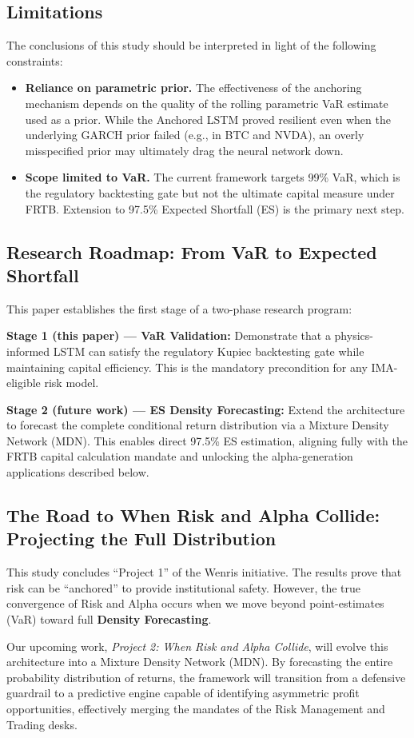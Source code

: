 \subsection*{Limitations}

The conclusions of this study should be interpreted in light of the following constraints:

\begin{itemize}
    \item \textbf{Reliance on parametric prior.} The effectiveness of the anchoring mechanism depends on the quality of the rolling parametric VaR estimate used as a prior. While the Anchored LSTM proved resilient even when the underlying GARCH prior failed (e.g., in BTC and NVDA), an overly misspecified prior may ultimately drag the neural network down.
    \item \textbf{Scope limited to VaR.} The current framework targets 99\% VaR, which is the regulatory backtesting gate but not the ultimate capital measure under FRTB. Extension to 97.5\% Expected Shortfall (ES) is the primary next step.
\end{itemize}

\subsection*{Research Roadmap: From VaR to Expected Shortfall}

This paper establishes the first stage of a two-phase research program:

\textbf{Stage 1 (this paper) --- VaR Validation:} Demonstrate that a physics-informed LSTM can satisfy the regulatory Kupiec backtesting gate while maintaining capital efficiency. This is the mandatory precondition for any IMA-eligible risk model.

\textbf{Stage 2 (future work) --- ES Density Forecasting:} Extend the architecture to forecast the complete conditional return distribution via a Mixture Density Network (MDN). This enables direct 97.5\% ES estimation, aligning fully with the FRTB capital calculation mandate and unlocking the alpha-generation applications described below.

\subsection*{The Road to When Risk and Alpha Collide: Projecting the Full Distribution}
This study concludes ``Project 1'' of the Wenris initiative. The results prove that risk can be ``anchored'' to provide institutional safety. However, the true convergence of Risk and Alpha occurs when we move beyond point-estimates (VaR) toward full \textbf{Density Forecasting}.

Our upcoming work, \textit{Project 2: When Risk and Alpha Collide}, will evolve this architecture into a Mixture Density Network (MDN). By forecasting the entire probability distribution of returns, the framework will transition from a defensive guardrail to a predictive engine capable of identifying asymmetric profit opportunities, effectively merging the mandates of the Risk Management and Trading desks.